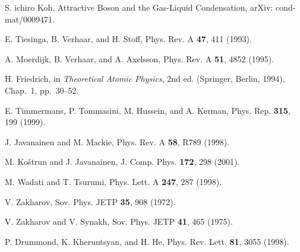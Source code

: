 \documentclass[%
   final       %
]{prospectus}
\begin{document}
\begin{thebibliography}{10}
S. ichiro Koh, Attractive Boson and the Gas-Liquid Condensation, arXiv:
  cond-mat/0009471.

E. Tiesinga, B. Verhaar, and H. Stoff, Phys. Rev. A {\bf 47},  411  (1993).

A. Moerdijk, B. Verhaar, and A. Axelsson, Phys. Rev. A {\bf 51},  4852  (1995).

H. Friedrich,  in {\em Theoretical Atomic Physics}, 2nd ed. (Springer, Berlin,
  1994), Chap.~1, pp.\ 30--52.

E. Timmermans, P. Tommasini, M. Hussein, and A. Kerman, Phys. Rep. {\bf 315},
  199  (1999).

J. Javanainen and M. Mackie, Phys. Rev. A {\bf 58},  R789  (1998).

M. Ko\v{s}trun and J. Javanainen, J. Comp. Phys. {\bf 172},  298  (2001).

M. Wadati and T. Tsurumi, Phys. Lett. A {\bf 247},  287  (1998).

V. Zakharov, Sov. Phys. JETP {\bf 35},  908  (1972).

V. Zakharov and V. Synakh, Sov. Phys. JETP {\bf 41},  465  (1975).

P. Drummond, K. Kheruntsyan, and H. He, Phys. Rev. Lett. {\bf 81},  3055
  (1998).

\end{thebibliography}

\backmatter %
\end{document}
